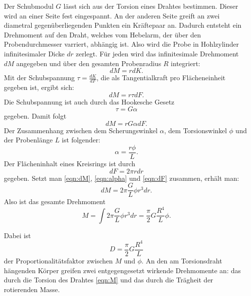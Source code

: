 \noindent Der Schubmodul $G$ lässt sich aus der Torsion eines Drahtes bestimmen.
Dieser wird an einer Seite fest eingespannt. An der anderen Seite greift
an zwei diametral gegenüberliegenden Punkten ein Kräftepaar an.
Dadurch entsteht ein Drehmoment auf den Draht, welches vom Hebelarm, der
über den Probendurchmesser varriert, abhängig ist. Also wird die Probe in
Hohlzylinder infinitesimaler Dicke $dr$ zerlegt. Für jeden wird das
infinitesimale Drehmoment $dM$ angegeben und über den gesamten Probenradius
$R$ integriert:
\begin{equation*}
    dM = r dK.
\end{equation*}
Mit der Schubspannung $\tau = \frac{dK}{dF}$, die als Tangentialkraft pro
Flächeneinheit gegeben ist, ergibt sich:
\begin{equation*}
    dM = r \tau dF.
\end{equation*}
Die Schubspannung ist auch durch das Hookesche Gesetz
\begin{equation*}
    \tau = G \alpha
\end{equation*}
gegeben. Damit folgt
\begin{equation}
    dM = r G \alpha dF.
    \label{eqn:dM}
\end{equation}
Der Zusammenhang zwischen dem Scherungswinkel $\alpha$, dem Torsionswinkel
$\phi$ und der Probenlänge $L$ ist folgender:
\begin{equation}
    \alpha = \frac{r \phi}{L}.
    \label{eqn:alpha}
\end{equation}
Der Flächeninhalt eines Kreisrings ist durch
\begin{equation}
    dF = 2 \pi r dr
    \label{eqn:dF}
\end{equation}
gegeben. Setzt man \eqref{eqn:dM}, \eqref{eqn:alpha} und \eqref{eqn:dF} zusammen, erhält man:
\begin{equation*}
    dM = 2 \pi \frac{G}{L} \phi r^3 dr.
\end{equation*}
Also ist das gesamte Drehmoment
\begin{equation}
    M = \int 2 \pi \frac{G}{L} \phi r^3 dr = \frac{\pi}{2} G \frac{R^4}{L} \phi.
    \label{eqn:M}
\end{equation}

\noindent Dabei ist 
\begin{equation}
    D = \frac{\pi}{2} G \frac{R^4}{L}
    \label{eqn:D}
\end{equation}
der Proportionalitätsfaktor zwischen $M$ und $\phi$.
An den am Torsionsdraht hängenden Körper greifen zwei entgegengesetzt
wirkende Drehmomente an: das durch die Torsion des Drahtes \eqref{eqn:M} und das durch die
Trägheit der rotierenden Masse. %

